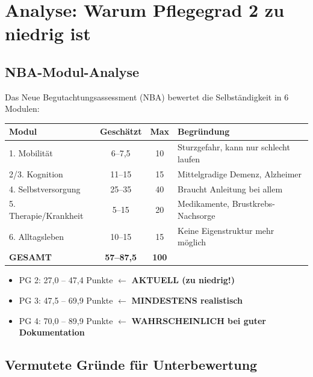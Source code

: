 \documentclass[11pt,a4paper]{article}
\begin{document}
\section{Analyse: Warum Pflegegrad 2 zu niedrig ist}

\subsection{NBA-Modul-Analyse}

Das Neue Begutachtungsassessment (NBA) bewertet die Selbständigkeit in 6 Modulen:

\begin{center}
\begin{tabular}{lccl}
\toprule
\textbf{Modul} & \textbf{Geschätzt} & \textbf{Max} & \textbf{Begründung} \\
\midrule
1. Mobilität & 6--7,5 & 10 & Sturzgefahr, kann nur schlecht laufen \\
2/3. Kognition & 11--15 & 15 & Mittelgradige Demenz, Alzheimer \\
4. Selbstversorgung & 25--35 & 40 & Braucht Anleitung bei allem \\
5. Therapie/Krankheit & 5--15 & 20 & Medikamente, Brustkrebs-Nachsorge \\
6. Alltagsleben & 10--15 & 15 & Keine Eigenstruktur mehr möglich \\
\midrule
\textbf{GESAMT} & \textbf{57--87,5} & \textbf{100} & \\
\bottomrule
\end{tabular}
\end{center}

\begin{warningbox}
\begin{itemize}[noitemsep]
    \item PG 2: 27,0 -- 47,4 Punkte $\leftarrow$ \textbf{AKTUELL (zu niedrig!)}
    \item PG 3: 47,5 -- 69,9 Punkte $\leftarrow$ \textbf{MINDESTENS realistisch}
    \item PG 4: 70,0 -- 89,9 Punkte $\leftarrow$ \textbf{WAHRSCHEINLICH bei guter Dokumentation}
\end{itemize}
\end{warningbox}

\subsection{Vermutete Gründe für Unterbewertung}
\end{document}
